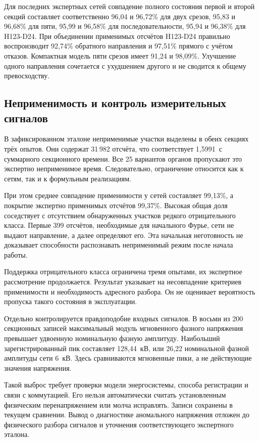 Для последних экспертных сетей совпадение полного состояния
первой и второй секций составляет соответственно
96,04 и 96,72\% для двух срезов,
95,83 и 96,68\% для пяти,
95,99 и 96,58\% для последовательности,
95,94 и 96,38\% для H123-D24.
При объединении применимых отсчётов H123-D24
правильно воспроизводит 92,74\% обратного направления
и 97,51\% прямого с учётом отказов.
Компактная модель пяти срезов имеет 91,24 и 98,09\%.
Улучшение одного направления сочетается
с ухудшением другого и не сводится к общему превосходству.

\subsection{Неприменимость и контроль измерительных сигналов}

В зафиксированном эталоне неприменимые участки
выделены в обеих секциях трёх опытов.
Они содержат 31\,982 отсчёта,
что соответствует 1,5991~с суммарного секционного времени.
Все 25 вариантов органов пропускают
это экспертно неприменимое время.
Следовательно, ограничение относится
как к сетям, так и к формульным реализациям.

При этом среднее совпадение применимости у сетей
составляет 99,13\%, а покрытие экспертно применимых
отсчётов 99,37\%.
Высокая общая доля соседствует
с отсутствием обнаруженных участков редкого отрицательного класса.
Первые 399 отсчётов, необходимые для начального Фурье,
сети не выдают направление, а далее определяют его.
Эта начальная неготовность не доказывает
способности распознавать неприменимый режим
после начала работы.

Поддержка отрицательного класса ограничена тремя опытами,
их экспертное рассмотрение продолжается.
Результат указывает на несовпадение критериев применимости
и необходимость адресного разбора.
Он не оценивает вероятность пропуска
такого состояния в эксплуатации.

Отдельно контролируется правдоподобие входных сигналов.
В восьми из 200 секционных записей
максимальный модуль мгновенного фазного напряжения
превышает удвоенную номинальную фазную амплитуду.
Наибольший зарегистрированный пик составляет 128,44~кВ,
или 26,22 номинальной фазной амплитуды сети 6~кВ.
Здесь сравниваются мгновенные пики,
а не действующие значения напряжения.

Такой выброс требует проверки модели энергосистемы,
способа регистрации и связи с коммутацией.
Его нельзя автоматически считать установленным
физическим перенапряжением или молча исправлять.
Записи сохранены в текущем сравнении.
Вывод о диагностике аномального напряжения
отложен до физического разбора сигналов
и уточнения соответствующего экспертного эталона.

